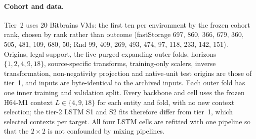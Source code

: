 \documentclass[a4paper,fleqn]{cas-dc}
\begin{document}
\paragraph{Cohort and data.} Tier~2 uses 20 Bitbrains VMs: the first ten per
environment by the frozen cohort rank, chosen by rank rather than outcome
(fastStorage 697, 860, 366, 679, 360, 505, 481, 109, 680, 50; Rnd 99, 409,
269, 493, 474, 97, 118, 233, 142, 151). Origins, legal support, the five
purged expanding outer folds, horizons $\{1,2,4,9,18\}$, source-specific
transforms, training-only scalers, inverse transformation, non-negativity
projection and native-unit test origins are those of tier~1, and inputs are
byte-identical to the archived inputs. Each outer fold has one inner
training and validation split. Every backbone and cell uses the frozen H64-M1
context $L\in\{4,9,18\}$ for each entity and fold, with no new context
selection; the tier-2 LSTM S1 and S2 fits therefore differ from tier~1, which
selected contexts per target. All four LSTM cells are refitted with one
pipeline so that the $2\times2$ is not confounded by mixing pipelines.
\end{document}
